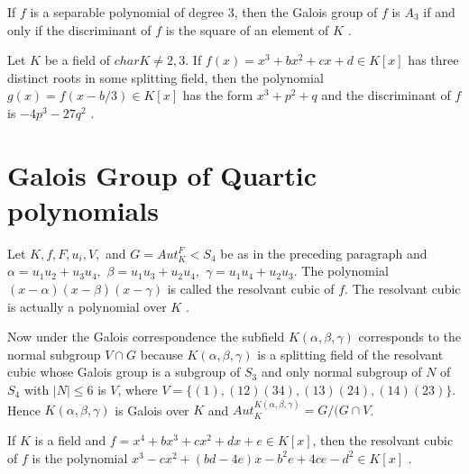 \begin{corollary}
  If \(f\) is a separable polynomial of degree \(3\), then the Galois group of \(f\) is \(A_3\) if and only if the discriminant of \(f\) is the square of an element of \(K\) \cite{hunger}.
\end{corollary}

\begin{theorem}
  Let \(K\) be a field of \(char K \neq 2,3 \). If \(f(x)=x^3+bx^2+cx+d \in K[x]\) has three distinct roots in some splitting field, then the polynomial \(g(x)=f(x-b/3) \in K[x]\) has the form \(x^3+p^2+q\) and the discriminant of \(f\) is \(-4p^3-27q^2\) \cite{hunger}.
\end{theorem}

\section{Galois Group of Quartic polynomials}
\begin{definition}
Let \(K, f, F, u_i, V,\) and \(G=Aut_K^F<S_4\) be as in the preceding paragraph and \(\alpha=u_1u_2+u_3u_4,\) \(\beta=u_1u_3+u_2u_4,\) \(\gamma=u_1u_4+u_2u_3\).
The polynomial \( (x- \alpha)(x- \beta)(x- \gamma) \) is called the resolvant cubic of \(f\). The resolvant cubic is actually a polynomial over \(K\) \cite{hunger}.\\
\end{definition}
Now under the Galois correspondence the subfield \(K(\alpha, \beta, \gamma)\) corresponds to the normal subgroup \(V \cap G\) because \(K(\alpha,\beta,\gamma)\) is a splitting field of the resolvant cubic
whose Galois group is a subgroup of \(S_3\) and only normal subgroup of \(N\) of \(S_4\) with \(|N| \leq 6\) is \(V\), where \(V=\{(1),(12)(34),(13)(24),(14)(23)\}\).\\
Hence \(K(\alpha, \beta, \gamma)\) is Galois over \(K\) and \(Aut_K^{K(\alpha, \beta, \gamma)} = G/(G \cap V\).

\begin{remark} If \(K\) is a field and \(f = x^4+bx^3+cx^2+dx+e \in K[x]\), then the resolvant cubic of \(f\) is the polynomial \(x^3-cx^2+(bd-4e)x-b^2e+4ce-d^2 \in K[x]\) \cite{hunger}.\\ \\
\end{remark}

